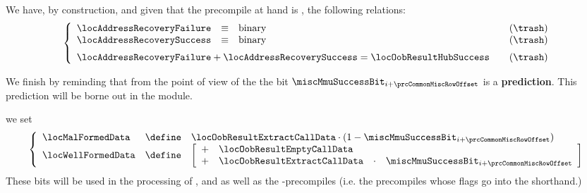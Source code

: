 \begin{description}
\begin{description}
\begin{description}
						\saNote{} We have, by construction, and given that the precompile at hand is \instEcrecover{}, the following relations:
						\[
							\left\{ \begin{array}{lclr}
								\locAddressRecoveryFailure   & \equiv & \text{binary} & \quad (\trash) \\
								\locAddressRecoverySuccess   & \equiv & \text{binary} & \quad (\trash) \vspace{2mm} \\
								\multicolumn{3}{l}{\locAddressRecoveryFailure + \locAddressRecoverySuccess = \locOobResultHubSuccess} & \quad (\trash) \\
							\end{array} \right.
						\]

						\saNote{} We finish by reminding that from the point of view of the \hubMod{} the bit $\miscMmuSuccessBit_{i + \prcCommonMiscRowOffset}$ is a \textbf{prediction}.
						This prediction will be borne out in the \ecDataMod{} module.
					\item[\underline{\instEcadd{}, \instEcmul{} and \instEcpairing{} as well as \inst{BLS}-precompile specific:}]
						we set
						\[
							\left\{ \begin{array}{lcl}
								\locMalFormedData  & \define & \locOobResultExtractCallData \cdot (1 - \miscMmuSuccessBit_{i + \prcCommonMiscRowOffset}) \\
								\locWellFormedData & \define & 
								\left[ \begin{array}{clcl}
									+ & \locOobResultEmptyCallData                                        \\
									+ & \locOobResultExtractCallData & \cdot & \miscMmuSuccessBit_{i + \prcCommonMiscRowOffset} \\
								\end{array} \right] \\
							\end{array} \right.
						\]
						\saNote{}
						These bits will be used in the processing of \instEcadd{}, \instEcmul{} and \instEcpairing{}
						as well as the -precompiles (i.e. the precompiles whose flags go into the \scenPrecompileCommonBls{} shorthand.)


\end{description}
\end{description}
\end{description}
